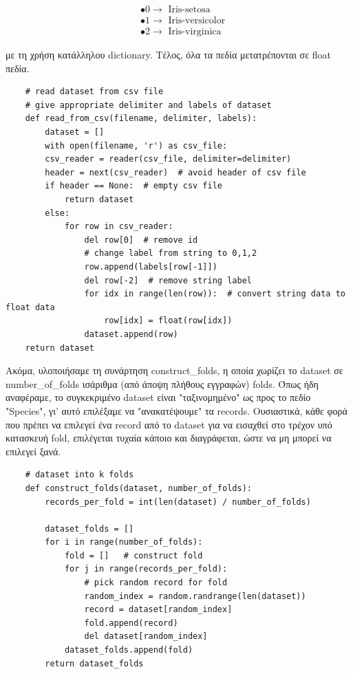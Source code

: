 \documentclass[12pt]{article}
\begin{document}
\begin{align*}
	& \bullet 0 \rightarrow \text{ Iris-setosa} \\
	& \bullet 1 \rightarrow \text{ Iris-versicolor} \\	
	& \bullet 2 \rightarrow \text{ Iris-virginica}	
\end{align*}

με τη χρήση κατάλληλου dictionary. Τέλος, όλα τα πεδία μετατρέπονται σε float πεδία. 

\begin{lstlisting}
	# read dataset from csv file
    # give appropriate delimiter and labels of dataset
    def read_from_csv(filename, delimiter, labels):
    	dataset = []
        with open(filename, 'r') as csv_file:
        csv_reader = reader(csv_file, delimiter=delimiter)
        header = next(csv_reader)  # avoid header of csv file
        if header == None:  # empty csv file
        	return dataset
       	else:
        	for row in csv_reader:
          		del row[0]  # remove id
          		# change label from string to 0,1,2
          		row.append(labels[row[-1]])
          		del row[-2]  # remove string label
          		for idx in range(len(row)):  # convert string data to float data
          			row[idx] = float(row[idx])
          		dataset.append(row)
 	return dataset
\end{lstlisting}

Ακόμα, υλοποιήσαμε τη συνάρτηση construct\_folds, η οποία χωρίζει το dataset σε number\_of\_folds ισάριθμα (από άποψη πλήθους εγγραφών) folds. Όπως ήδη αναφέραμε, το συγκεκριμένο dataset είναι "ταξινομημένο" ως προς το πεδίο "Species", γι' αυτό επιλέξαμε να "ανακατέψουμε" τα records. Ουσιαστικά, κάθε φορά που πρέπει να επιλεγεί ένα record από το dataset για να εισαχθεί στο τρέχον υπό κατασκευή fold, επιλέγεται τυχαία κάποιο και διαγράφεται, ώστε να μη μπορεί να επιλεγεί ξανά. 

\begin{lstlisting}
	# dataset into k folds
	def construct_folds(dataset, number_of_folds):
		records_per_fold = int(len(dataset) / number_of_folds)

		dataset_folds = []
		for i in range(number_of_folds):
			fold = []   # construct fold
			for j in range(records_per_fold):
				# pick random record for fold
				random_index = random.randrange(len(dataset))
				record = dataset[random_index]
				fold.append(record)
				del dataset[random_index]
			dataset_folds.append(fold)
		return dataset_folds
\end{lstlisting}
\end{document}
